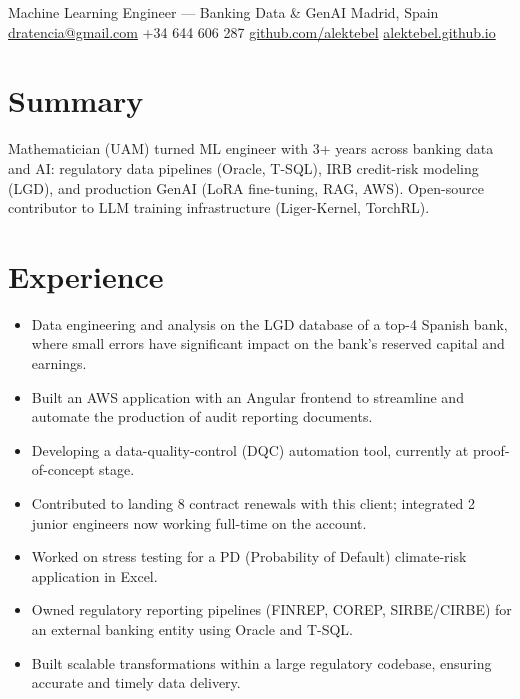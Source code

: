 \documentclass[10pt,a4paper]{article}
\begin{document}
  {Machine Learning Engineer --- Banking Data \& GenAI}
  {Madrid, Spain \;\textbullet\; \href{mailto:dratencia@gmail.com}{dratencia@gmail.com} \;\textbullet\; +34 644 606 287}
  {\href{https://github.com/alektebel}{github.com/alektebel} \;\textbullet\; \href{https://alektebel.github.io}{alektebel.github.io}}

\section{Summary}
Mathematician (UAM) turned ML engineer with 3+ years across banking data and AI:
regulatory data pipelines (Oracle, T-SQL), IRB credit-risk modeling (LGD), and
production GenAI (LoRA fine-tuning, RAG, AWS). Open-source contributor to LLM
training infrastructure (Liger-Kernel, TorchRL).

\section{Experience}

\begin{itemize}
  \item Data engineering and analysis on the LGD database of a top-4 Spanish bank, where small errors have significant impact on the bank's reserved capital and earnings.
  \item Built an AWS application with an Angular frontend to streamline and automate the production of audit reporting documents.
  \item Developing a data-quality-control (DQC) automation tool, currently at proof-of-concept stage.
  \item Contributed to landing 8 contract renewals with this client; integrated 2 junior engineers now working full-time on the account.
\end{itemize}

\vspace{4pt}
\begin{itemize}
  \item Worked on stress testing for a PD (Probability of Default) climate-risk application in Excel.
\end{itemize}

\vspace{4pt}
\begin{itemize}
  \item Owned regulatory reporting pipelines (FINREP, COREP, SIRBE/CIRBE) for an external banking entity using Oracle and T-SQL.
  \item Built scalable transformations within a large regulatory codebase, ensuring accurate and timely data delivery.
\end{itemize}
\end{document}

